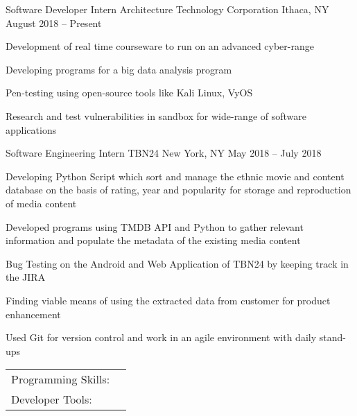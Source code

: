 \documentclass[]{awesome-cv}
\begin{document}
\vspace{-2mm}
\begin{cventries}
	\cventry
	{Software Developer Intern}
	{Architecture Technology Corporation}
	{Ithaca, NY}
	{August 2018 – Present}
	{\begin{cvitems}
		\item {Development of real time courseware to run on an advanced cyber-range}
		\item {Developing programs for a big data analysis program}
		\item {Pen-testing using open-source tools like Kali Linux, VyOS}
		\item {Research and test vulnerabilities in sandbox for wide-range of software applications}
		\end{cvitems}}
	\cventry
	{Software Engineering Intern}
	{TBN24}
	{New York, NY}
	{May 2018 – July 2018}
	{\begin{cvitems}
		\item {Developing Python Script which sort and manage the ethnic movie and content database on the basis of rating, year and popularity for storage and reproduction of media content}
		\item {Developed programs using TMDB API and Python to gather relevant information and populate the metadata of the existing media content}
		\item {Bug Testing on the Android and Web Application of TBN24 by keeping track in the JIRA}
		\item {Finding viable means of using the extracted data from customer for product enhancement}
		\item {Used Git for version control and work in an agile environment with daily stand-ups}
		\end{cvitems}}
\end{cventries}
\begin{cventries}
	\cventry
	{}
	{\def\arraystretch{1.15}{\begin{tabular}{ l l }
		Programming Skills:  & {\skill{ Python, Java, JavaScript, React Native, Bash, C, Bootstrap, Angular, HTML5, Pen-Testing}} \\
		Developer Tools:  & {\skill{ Git, JIRA, Bitbucket, Vim, Jetbrains\textquotesingle{} IDE, VS Code, Emacs, Kali Linux}} \\
		\end{tabular}}}
	{}
	{}
	{}
\end{cventries}
\end{document}

